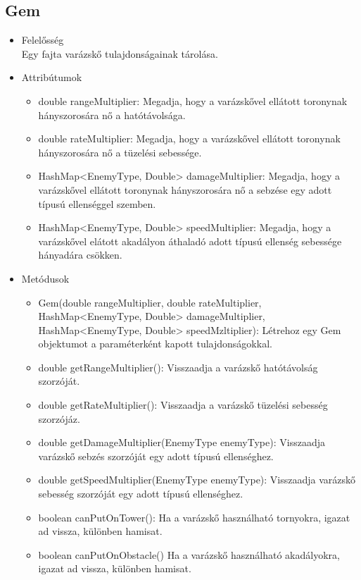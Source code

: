\subsection{Gem}
\begin{itemize}
\item Felelősség\\
Egy fajta varázskő tulajdonságainak tárolása.
\item Attribútumok\\
	\begin{itemize}
		\item double rangeMultiplier: Megadja, hogy a varázskővel ellátott toronynak hányszorosára nő a hatótávolsága.
		\item double rateMultiplier: Megadja, hogy a varázskővel ellátott toronynak hányszorosára nő a tüzelési sebessége.
		\item HashMap<EnemyType, Double> damageMultiplier: Megadja, hogy a varázskővel ellátott toronynak hányszorosára nő a sebzése egy adott típusú ellenséggel szemben.
		\item HashMap<EnemyType, Double> speedMultiplier: Megadja, hogy a varázskővel elátott akadályon áthaladó adott típusú ellenség sebessége hányadára csökken.
	\end{itemize}
\item Metódusok\\
	\begin{itemize}
		\item Gem(double rangeMultiplier, double rateMultiplier, HashMap<EnemyType, Double> damageMultiplier, HashMap<EnemyType, Double> speedMzltiplier): Létrehoz egy Gem objektumot a paraméterként kapott tulajdonságokkal.
		\item double getRangeMultiplier(): Visszaadja a varázskő hatótávolság szorzóját.
		\item double getRateMultiplier(): Visszaadja a varázskő tüzelési sebesség szorzójáz.
		\item double getDamageMultiplier(EnemyType enemyType): Visszaadja varázskő sebzés szorzóját egy adott típusú ellenséghez.
		\item double getSpeedMultiplier(EnemyType enemyType): Visszaadja varázskő sebesség szorzóját egy adott típusú ellenséghez.
		\item boolean canPutOnTower(): Ha a varázskő használható tornyokra, igazat ad vissza, különben hamisat.
		\item boolean canPutOnObstacle() Ha a varázskő használható akadályokra, igazat ad vissza, különben hamisat.
	\end{itemize}
\end{itemize}

